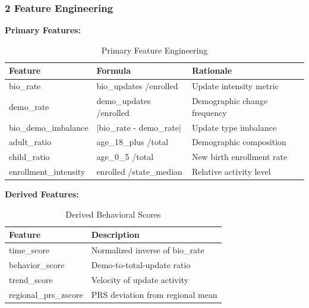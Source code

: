 \documentclass[11pt, a4paper]{article}
\begin{document}
\subsubsection{2 Feature Engineering}

\textbf{Primary Features:}


\vspace{0.8em}
\begin{table}[H]
\caption{Primary Feature Engineering}
{\small
\begin{tabularx}{\textwidth}{|Y|Y|Y|}
\hline
\textbf{Feature} & \textbf{Formula} & \textbf{Rationale} \\ \hline
bio\_rate & bio\_updates /\allowbreak  enrolled & Update intensity metric \\ \hline
demo\_rate & demo\_updates /\allowbreak  enrolled & Demographic change frequency \\ \hline
bio\_demo\_imbalance & $|$bio\_rate - demo\_rate$|$ & Update type imbalance \\ \hline
adult\_ratio & age\_18\_plus /\allowbreak  total & Demographic composition \\ \hline
child\_ratio & age\_0\_5 /\allowbreak  total & New birth enrollment rate \\ \hline
enrollment\_intensity & enrolled /\allowbreak  state\_median & Relative activity level \\ \hline
\end{tabularx}
}
\end{table}
\vspace{1em}

\textbf{Derived Features:}


\vspace{0.8em}
\begin{table}[H]
\caption{Derived Behavioral Scores}
{\small
\begin{tabularx}{\textwidth}{|Y|Y|}
\hline
\textbf{Feature} & \textbf{Description} \\ \hline
time\_score & Normalized inverse of bio\_rate \\ \hline
behavior\_score & Demo-to-total-update ratio \\ \hline
trend\_score & Velocity of update activity \\ \hline
regional\_prs\_zscore & PRS deviation from regional mean \\ \hline
\end{tabularx}
}
\end{table}
\vspace{1em}
\end{document}
